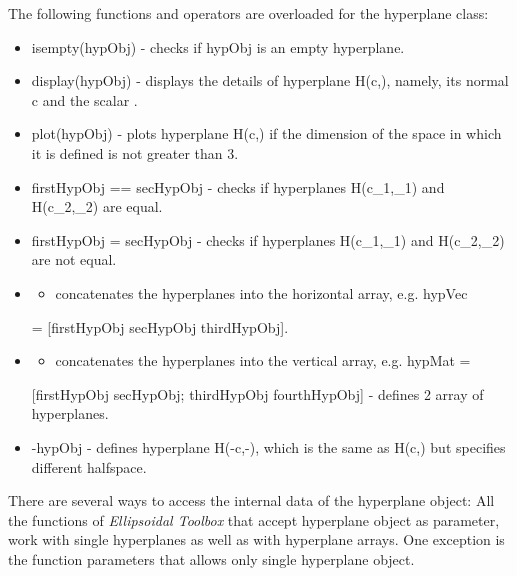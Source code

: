 \documentclass[letterpaper,10pt,english]{sphinxmanual}
\begin{document}
The following functions and operators are overloaded for the hyperplane
class:
\begin{itemize}
\item {} 
isempty(hypObj) - checks if hypObj is an empty hyperplane.

\item {} 
display(hypObj) - displays the details of hyperplane
H(c,\gamma), namely, its normal c and the scalar
\gamma.

\item {} 
plot(hypObj) - plots hyperplane H(c,\gamma) if the dimension
of the space in which it is defined is not greater than 3.

\item {} 
firstHypObj == secHypObj - checks if hyperplanes
H(c_1,\gamma_1) and H(c_2,\gamma_2) are equal.

\item {} 
firstHypObj = secHypObj - checks if hyperplanes
H(c_1,\gamma_1) and H(c_2,\gamma_2) are not equal.

\item {} \begin{itemize}
\item {} 
concatenates the hyperplanes into the horizontal array, e.g. hypVec

\end{itemize}

= {[}firstHypObj secHypObj thirdHypObj{]}.

\item {} \begin{itemize}
\item {} 
concatenates the hyperplanes into the vertical array, e.g. hypMat =

\end{itemize}

{[}firstHypObj secHypObj; thirdHypObj fourthHypObj{]} - defines
2 array of hyperplanes.

\item {} 
-hypObj - defines hyperplane H(-c,-\gamma), which is the same
as H(c,\gamma) but specifies different halfspace.

\end{itemize}

There are several ways to access the internal data of the hyperplane
object: All the functions of \emph{Ellipsoidal Toolbox} that accept
hyperplane object as parameter, work with single hyperplanes as well as
with hyperplane arrays. One exception is the function parameters that
allows only single hyperplane object.
\end{document}
